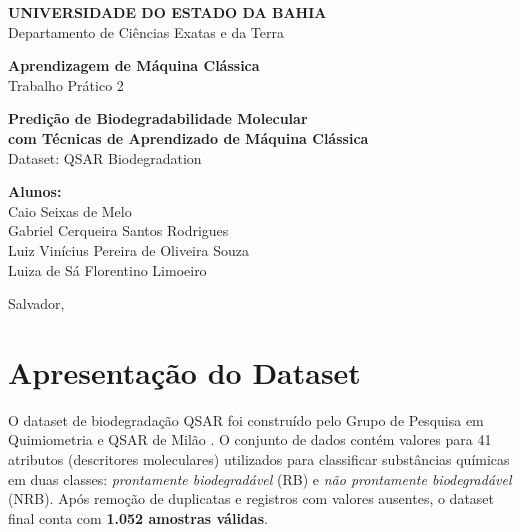 \documentclass[12pt, a4paper]{article}
\begin{document}
\begin{titlepage}
  \centering
  \vspace*{1.5cm}
  {\large \textbf{UNIVERSIDADE DO ESTADO DA BAHIA}\\[0.3cm]}
  {\normalsize Departamento de Ciências Exatas e da Terra\\[2cm]}

  {\Large \textbf{Aprendizagem de Máquina Clássica}\\[0.5cm]}
  {\large Trabalho Prático 2\\[2cm]}

  {\LARGE \textbf{Predição de Biodegradabilidade Molecular\\
  com Técnicas de Aprendizado de Máquina Clássica}\\[0.5cm]}
  {\large Dataset: QSAR Biodegradation\\[3cm]}

  \begin{flushleft}
    \textbf{Alunos:}\\[0.3cm]
    Caio Seixas de Melo\\
    Gabriel Cerqueira Santos Rodrigues\\
    Luiz Vinícius Pereira de Oliveira Souza\\
    Luiza de Sá Florentino Limoeiro\\[2cm]
  \end{flushleft}

  \vfill
  {\normalsize Salvador, \the\year}
\end{titlepage}

\tableofcontents
\newpage

\section{Apresentação do Dataset}

O dataset de biodegradação QSAR foi construído pelo Grupo de Pesquisa em
Quimiometria e QSAR de Milão \citep{mansouri2013}. O conjunto de dados contém
valores para 41 atributos (descritores moleculares) utilizados para classificar
substâncias químicas em duas classes: \textit{prontamente biodegradável} (RB) e
\textit{não prontamente biodegradável} (NRB). Após remoção de duplicatas e
registros com valores ausentes, o dataset final conta com \textbf{1.052 amostras
válidas}.
\end{document}

